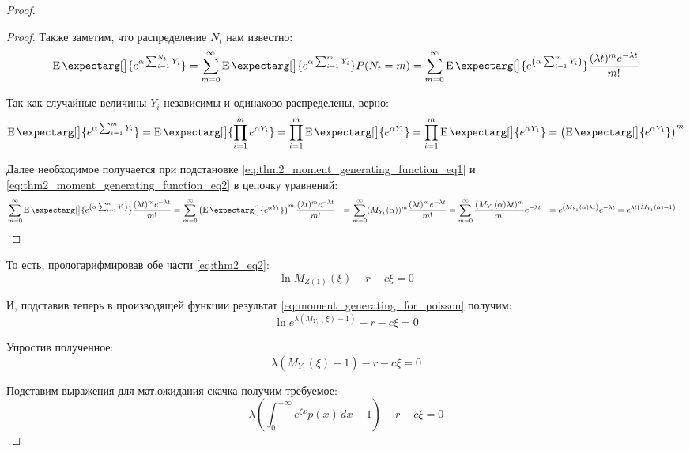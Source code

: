 \documentclass[a4paper,12pt]{article}
\theoremstyle{definition}
\newcommand{\expect}{\operatorname{E}\expectarg}
\begin{document}
\begin{proof}
\begin{proof}
Также заметим, что распределение $N_t$ нам известно:
\begin{equation}\label{eq:thm2_moment_generating_function_eq1}
     \expect[\big]{e^{\alpha \sum_{i=1}^{N_t} Y_i}} = \sum_{m=0}^{\infty} \expect[\big]{e^{\alpha \sum_{i=1}^{m} Y_i}} P(N_t = m) = \sum_{m=0}^{\infty} \expect[\big]{e^{\left(\alpha \sum_{i=1}^{m} Y_i\right)}} \frac{(\lambda t)^{m} e^{-\lambda t}}{m!}
\end{equation}

Так как случайные величины $Y_i$ независимы и одинаково распределены, верно:
\begin{equation}\label{eq:thm2_moment_generating_function_eq2}
     \expect[\big]{e^{\alpha \sum_{i=1}^{m} Y_i}} = \expect[\big]{\prod_{i=1}^{m} e^{\alpha Y_i}} = \prod_{i=1}^{m}  \expect[\big]{e^{\alpha Y_i}} = \prod_{i=1}^{m}  \expect[\big]{e^{\alpha Y_1}} = \left( \expect[\big]{e^{\alpha Y_1}} \right)^{m}
\end{equation}

Далее необходимое получается при подстановке \eqref{eq:thm2_moment_generating_function_eq1} и \eqref{eq:thm2_moment_generating_function_eq2} в цепочку уравнений:
\begin{equation*}
\begin{split}
    \sum_{m=0}^{\infty} \expect[\big]{e^{\left(\alpha \sum_{i=1}^{m} Y_i\right)}} \frac{(\lambda t)^{m} e^{-\lambda t}}{m!} &= \sum_{m=0}^{\infty} \left(\expect[\big]{e^{\alpha Y_1}}\right)^{m} \frac{(\lambda t)^{m} e^{-\lambda t}}{m!} &= \sum_{m=0}^{\infty} (M_{Y_1} (\alpha))^{m} \frac{(\lambda t)^{m} e^{-\lambda t}}{m!} &= \sum_{m=0}^{\infty} \frac{(M_{Y_1} (\alpha) \lambda t)^{m}}{m!} e^{-\lambda t} &= e^{\left(M_{Y_1} (\alpha) \lambda t\right)} e^{-\lambda t} &= e^{\lambda t \left(M_{Y_1}(\alpha) - 1\right)}
\end{split}
\end{equation*}
\end{proof}

То есть, прологарифмировав обе части \eqref{eq:thm2_eq2}:
\begin{equation*}
\ln{M_{Z(1)}(\xi)} - r - c\xi = 0
\end{equation*}

И, подставив теперь в производящей функции результат \eqref{eq:moment_generating_for_poisson} получим:
\begin{equation*}
\ln{e^{\lambda (M_{Y_1}(\xi) - 1)}} - r - c\xi = 0
\end{equation*}

Упростив полученное:
\begin{equation*}
\lambda \left(M_{Y_1}(\xi) - 1\right) - r - c\xi = 0
\end{equation*}

Подставим выражения для мат.ожидания скачка получим требуемое:
\begin{equation*}
\lambda \left(\int_{0}^{+\infty} e^{\xi x} p(x) \,dx - 1\right) - r - c\xi = 0
\end{equation*}
\end{proof}
\end{document}
